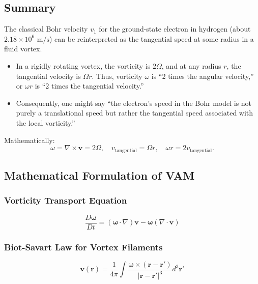 \documentclass[a4paper,10pt]{article}
\begin{document}
    \subsection{Summary}
    The classical Bohr velocity $v_1$ for the ground-state electron in hydrogen (about $2.18 \times 10^6 \text{ m/s}$) can be reinterpreted as the tangential speed at some radius in a fluid vortex.
    \begin{itemize}
        \item In a rigidly rotating vortex, the vorticity is $2\Omega$, and at any radius $r$, the tangential velocity is $\Omega r$. Thus, vorticity $\omega$ is ``2 times the angular velocity,'' or $\omega r$ is ``2 times the tangential velocity.''
        \item Consequently, one might say ``the electron’s speed in the Bohr model is not purely a translational speed but rather the tangential speed associated with the local vorticity.''
    \end{itemize}
    Mathematically:
    \begin{equation}
        \boxed{ \omega = \nabla \times \mathbf{v} = 2\Omega,\quad v_{\text{tangential}} = \Omega r, \quad \omega r = 2 v_{\text{tangential}}. }
    \end{equation}


    \subsection{Mathematical Formulation of VAM}\label{sec:mathematical-formulation-of-vam}

    \subsubsection{Vorticity Transport Equation}\label{subsec:vorticity-transport-equation}
    \begin{equation} \label{eq:vorticity}
        \frac{D\boldsymbol{\omega}}{Dt} = (\boldsymbol{\omega} \cdot \nabla) \mathbf{v} - \boldsymbol{\omega} (\nabla \cdot \mathbf{v})
    \end{equation}


    \subsubsection{Biot-Savart Law for Vortex Filaments}\label{subsec:biot-savart-law-for-vortex-filaments}
    \begin{equation}
        \mathbf{v}(\mathbf{r}) = \frac{1}{4\pi} \int \frac{\boldsymbol{\omega} \times (\mathbf{r} - \mathbf{r'})}{|\mathbf{r} - \mathbf{r'}|^3} d^3\mathbf{r'}\label{eq:equation}
    \end{equation}
\end{document}
